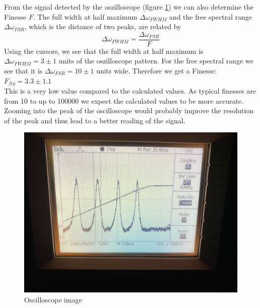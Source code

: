 \documentclass{article}
\begin{document}
From the signal detected by the oszilloscope (figure \ref{Osz1}) we can also determine the Finesse $F$. The full width at half maximum $\Delta\omega_{FWHM}$ and the free spectral range $\Delta\omega_{FSR}$, which is the distance of two peaks, are related by 
\begin{equation}
\Delta\omega_{FWHM} = \frac{\Delta\omega_{FSR}}{F}
\label{FinesseOszilloskopbild}
\end{equation}
Using the cursors, we see that the full width at half maximum is $\Delta\omega_{FWHM} =3 \pm 1$ units of the oszilloscope pattern. For the free spectral range we see that it is $\Delta\omega_{FSR} = 10 \pm 1$ units wide. Therefore we get a Finesse:\\
$F_{fig} = 3.3 \pm 1.1$\\
This is a very low value compared to the calculated values. As typical finesses are from 10 to up to 100000 \cite{optres} we expect the calculated values to be more accurate. Zooming into the peak of the oscilloscope would probably improve the resolution of the peak and thus lead to a better reading of the signal.\\

\begin{figure}[H]
\includegraphics[width=\textwidth]{oszilloskopbild.jpg}
\caption{Oscilloscope image}
\label{Osz1}
\end{figure}
\end{document}
